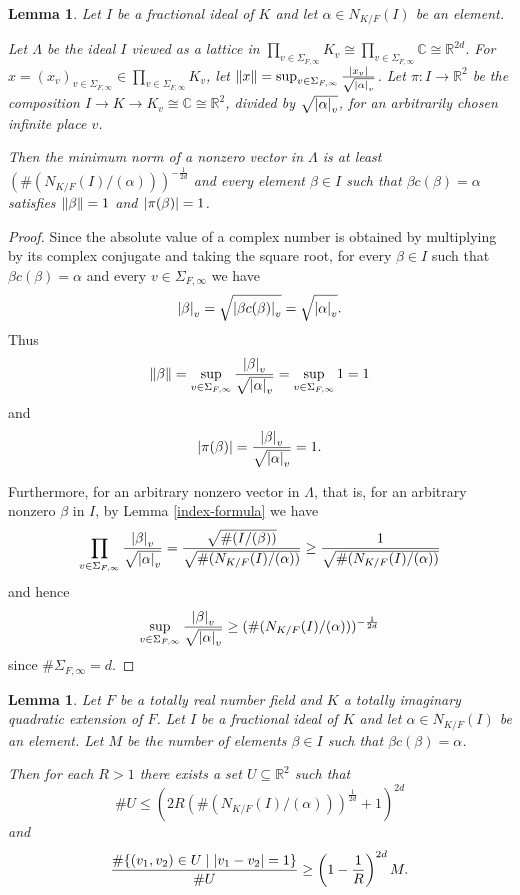 \documentclass[12pt]{amsart}
\newtheorem{lemma}[theo]{Lemma}
\theoremstyle{remark}
\theoremstyle{definition}
\begin{document}
\begin{lemma}\label{lattice-from-ideal} Let $I$ be a fractional ideal of $K$ and let $\alpha \in N_{K/F} (I)$ be an element. 



Let $\Lambda$ be the ideal $I$ viewed as a lattice in $\prod_{v\in \Sigma_{F,\infty}}  K_v \cong \prod_{v\in \Sigma_{F,\infty}} \mathbb C \cong \mathbb R^{2d}$. For $x = (x_v)_{v \in \Sigma_{F,\infty}}\in \prod_{v\in \Sigma_{F,\infty}}  K_v$, let $\norm{x} = \sup_{v \in \Sigma_{F,\infty}} \frac{ \abs{x_v}}{\sqrt{\abs{\alpha}_v}}$. Let $\pi \colon I \to \mathbb R^2$ be the composition $I \to K \to K_v \cong \mathbb C \cong \mathbb R^2$, divided by $\sqrt{ \abs{\alpha}_v}$, for an arbitrarily chosen infinite place $v$. 

Then the minimum norm of a nonzero vector in $\Lambda$ is at least  $ (\# ( N_{K/F} (I)/ (\alpha)))^{-\frac{1}{2d}}$ and every element $\beta \in I $ such that $\beta c(\beta)=\alpha$ satisfies $\norm{\beta} =1$ and $\abs{\pi(\beta)}=1$. \end{lemma}

\begin{proof} Since the absolute value of a complex number is obtained by multiplying by its complex conjugate and taking the square root, for every $\beta\in I$ such that $\beta c(\beta)=\alpha$ and every $v\in \Sigma_{F,\infty}$ we have \[ \abs{\beta}_v = \sqrt{ \abs{ \beta c(\beta)}_v } =\sqrt{\abs{\alpha}_v}.\]
Thus
\[ \norm{\beta} =\sup_{v \in \Sigma_{F,\infty}} \frac{ \abs{\beta}_v}{\sqrt{\abs{\alpha}_v}}= \sup_{v \in \Sigma_{F,\infty}} 1 =1\]
and
\[ \abs{\pi(\beta)}=\frac{ \abs{\beta}_v}{\sqrt{\abs{\alpha}_v}}=1.\]

Furthermore, for an arbitrary nonzero vector in $\Lambda$, that is, for an arbitrary nonzero $\beta$ in $I$, by Lemma \ref{index-formula} we have
\[ \prod_{v \in \Sigma_{F,\infty}} \frac{ \abs{\beta}_v }{ \sqrt{ \abs{\alpha}_v}} =  \frac{ \sqrt{\# (I/(\beta))}}{\sqrt{  \# (N_{K/F}(I) /(\alpha))}} \geq \frac{1}{\sqrt{  \# (N_{K/F}(I)/(\alpha))}}\]
and hence
\[ \sup_{v \in \Sigma_{F,\infty}}\frac{ \abs{\beta}_v }{ \sqrt{ \abs{\alpha}_v}}  \geq (\# (N_{K/F}(I)/(\alpha)))^{-\frac{1}{2d}}\]
since $\#\Sigma_{F,\infty}= d$. \end{proof}

\begin{lemma}\label{set-from-ideal} Let $F$ be a totally real number field and $K$ a totally imaginary quadratic extension of $F$. Let $I$ be a fractional ideal of $K$ and let $\alpha \in N_{K/F}(I)$ be an element.  Let $M$ be the number of elements $\beta \in I $ such that $\beta c(\beta)=\alpha$.

Then for each $R>1$  there exists a set $U \subseteq \mathbb R^2$ such that \[\# U \leq  \left( 2R (\# (N_{K/F}(I)/(\alpha)))^{\frac{1}{2d}} +1 \right)^{2d}\] and \begin{equation}\frac{\# \{ (v_1,v_2) \in U \mid \abs{v_1-v_2}=1\} }{ \# U} \geq \left(1-\frac{1}{R}\right)^{2d} M .\end{equation}
\end{lemma}
\end{document}
